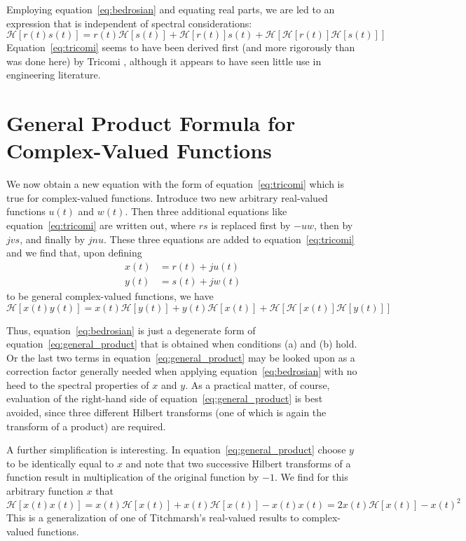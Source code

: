 \documentclass[12pt]{article}
\begin{document}
Employing equation~\eqref{eq:bedrosian} and equating real parts, we are led to an expression that is independent of spectral considerations:
\begin{equation}
\mathcal{H}[r(t) s(t)] = r(t) \mathcal{H}[s(t)] + \mathcal{H}[r(t)] s(t) + \mathcal{H}[\mathcal{H}[r(t)] \mathcal{H}[s(t)]]
\label{eq:tricomi}
\end{equation}
Equation~\eqref{eq:tricomi} seems to have been derived first (and more rigorously than was done here) by Tricomi \cite{Tricomi1951}, although it appears to have seen little use in engineering literature.

\section{General Product Formula for Complex-Valued Functions}

We now obtain a new equation with the form of equation~\eqref{eq:tricomi} which is true for complex-valued functions. Introduce two new arbitrary real-valued functions $u(t)$ and $w(t)$. Then three additional equations like equation~\eqref{eq:tricomi} are written out, where $rs$ is replaced first by $-uw$, then by $jvs$, and finally by $jnu$. These three equations are added to equation~\eqref{eq:tricomi} and we find that, upon defining
\begin{align}
x(t) &= r(t) + j u(t) \label{eq:x_general} \\
y(t) &= s(t) + j w(t) \label{eq:y_general}
\end{align}
to be general complex-valued functions, we have
\begin{equation}
\mathcal{H}[x(t) y(t)] = x(t) \mathcal{H}[y(t)] + y(t) \mathcal{H}[x(t)] + \mathcal{H}[\mathcal{H}[x(t)] \mathcal{H}[y(t)]]
\label{eq:general_product}
\end{equation}

Thus, equation~\eqref{eq:bedrosian} is just a degenerate form of equation~\eqref{eq:general_product} that is obtained when conditions (a) and (b) hold. Or the last two terms in equation~\eqref{eq:general_product} may be looked upon as a correction factor generally needed when applying equation~\eqref{eq:bedrosian} with no heed to the spectral properties of $x$ and $y$. As a practical matter, of course, evaluation of the right-hand side of equation~\eqref{eq:general_product} is best avoided, since three different Hilbert transforms (one of which is again the transform of a product) are required.

A further simplification is interesting. In equation~\eqref{eq:general_product} choose $y$ to be identically equal to $x$ and note that two successive Hilbert transforms of a function result in multiplication of the original function by $-1$. We find for this arbitrary function $x$ that
\begin{equation}
\mathcal{H}[x(t) x(t)] = x(t) \mathcal{H}[x(t)] + x(t) \mathcal{H}[x(t)] - x(t) x(t) = 2 x(t) \mathcal{H}[x(t)] - x(t)^2
\label{eq:titchmarsh}
\end{equation}
This is a generalization of one of Titchmarsh’s real-valued results \cite{Titchmarsh1937} to complex-valued functions.
\end{document}
